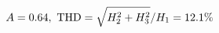 \documentclass[preview]{standalone}
\begin{document}
\begin{align*}
\special{dvisvgm:raw <g id='unique000'>}A=0.64,\ \text{THD}=\sqrt{H_2^2+H_3^2}/H_1=12.1\%\special{dvisvgm:raw </g>}
\end{align*}
\end{document}
